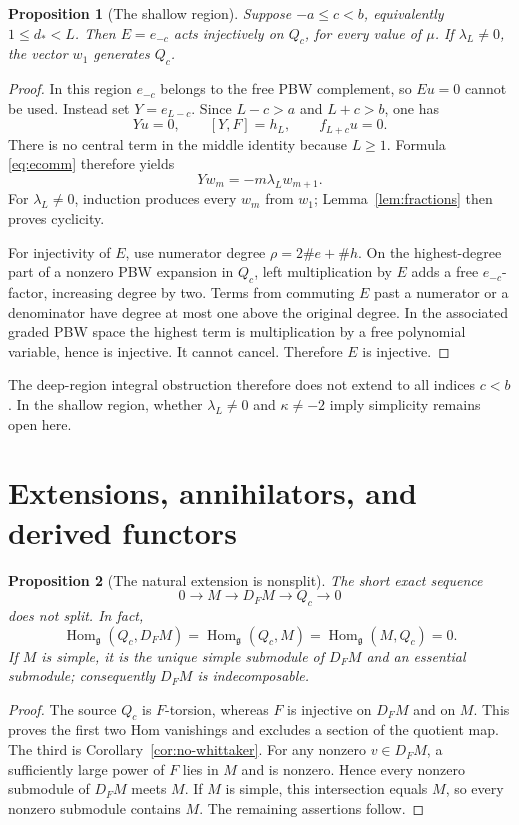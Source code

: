 \documentclass[11pt,a4paper]{article}
\newcommand{\g}{\mathfrak g}
\newcommand{\Hom}{\operatorname{Hom}}
\theoremstyle{plainupright}
\newtheorem{proposition}{Proposition}[section]
\begin{document}
\begin{proposition}[The shallow region]\label{prop:shallow}
Suppose \(-a\le c<b\), equivalently \(1\le d_*<L\).
Then \(E=e_{-c}\) acts injectively on \(Q_c\), for every value of \(\mu\).
If \(\lambda_L\ne0\), the vector \(w_1\) generates \(Q_c\).
\end{proposition}
\begin{proof}
In this region \(e_{-c}\) belongs to the free PBW complement, so
\(Eu=0\) cannot be used. Instead set \(Y=e_{L-c}\).
Since \(L-c>a\) and \(L+c>b\), one has
\[
Yu=0,\qquad [Y,F]=h_L,\qquad f_{L+c}u=0.
\]
There is no central term in the middle identity because \(L\ge1\).
Formula \eqref{eq:ecomm} therefore yields
\[
Yw_m=-m\lambda_Lw_{m+1}.
\]
For \(\lambda_L\ne0\), induction produces every \(w_m\) from \(w_1\);
Lemma~\ref{lem:fractions} then proves cyclicity.

For injectivity of \(E\), use numerator degree \(\rho=2\#e+\#h\).
On the highest-degree part of a nonzero PBW expansion in \(Q_c\),
left multiplication by \(E\) adds a free \(e_{-c}\)-factor, increasing
degree by two. Terms from commuting \(E\) past a numerator or a
denominator have degree at most one above the original degree.
In the associated graded PBW space the highest term is multiplication
by a free polynomial variable, hence is injective. It cannot cancel.
Therefore \(E\) is injective.
\end{proof}

The deep-region integral obstruction therefore does not extend to all
indices \(c<b\). In the shallow region, whether
\(\lambda_L\ne0\) and \(\kappa\ne-2\) imply simplicity remains open here.

\section{Extensions, annihilators, and derived functors}

\begin{proposition}[The natural extension is nonsplit]\label{prop:extension}
The short exact sequence
\[
0\longrightarrow M\longrightarrow D_FM\longrightarrow Q_c\longrightarrow0
\]
does not split. In fact,
\[
\Hom_\g(Q_c,D_FM)=\Hom_\g(Q_c,M)=\Hom_\g(M,Q_c)=0.
\]
If \(M\) is simple, it is the unique simple submodule of \(D_FM\)
and an essential submodule; consequently \(D_FM\) is indecomposable.
\end{proposition}
\begin{proof}
The source \(Q_c\) is \(F\)-torsion, whereas \(F\) is injective on
\(D_FM\) and on \(M\). This proves the first two Hom vanishings and
excludes a section of the quotient map. The third is
Corollary~\ref{cor:no-whittaker}.
For any nonzero \(v\in D_FM\), a sufficiently large power of \(F\)
lies in \(M\) and is nonzero. Hence every nonzero submodule of \(D_FM\)
meets \(M\). If \(M\) is simple, this intersection equals \(M\),
so every nonzero submodule contains \(M\).
The remaining assertions follow.
\end{proof}
\end{document}
